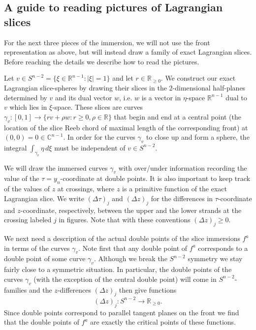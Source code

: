 \documentclass[reqno,11pt]{amsart}
\numberwithin{equation}{section}
\theoremstyle{my}
\theoremstyle{my}
\theoremstyle{your}
\newcommand{\R}{\mathbb{R}}
\newcommand{\C}{\mathbb{C}}
\begin{document}
\subsection{A guide to reading pictures of Lagrangian slices}
For the next three pieces of the immersion, we will not use the front representation as above, but will instead draw a family of exact Lagrangian slices. Before reaching the details we describe how to read the pictures.





Let $v\in S^{n-2}=\{\xi\in \R^{n-1}\colon |\xi|=1\}$ and let $r\in \R_{\ge 0}$. We construct our exact Lagrangian slice-spheres by drawing their slices in the $2$-dimensional half-planes determined by $v$ and its dual vector $w$, i.e. $w$ is a vector in $\eta$-space $\R^{n-1}$ dual to $v$ which lies in $\xi$-space. These slices are curves $\gamma_{v}\colon [0,1]\to\{rv+\rho w\colon r\ge 0, \rho\in\R\}$ that begin and end at a central point (the location of the slice Reeb chord of maximal length of the corresponding front) at $(0,0)=0\in\C^{n-1}$. In order for the curves $\gamma_{v}$ to close up and form a sphere, the integral $\int_{\gamma_{v}}\eta\, d\xi$ must be independent of $v\in S^{n-2}$. 

We will draw the immersed curves $\gamma_{v}$ with over/under information recording the value of the $\tau=y_n$-coordinate  at double points. It is also important to keep track of the values of $z$ at crossings, where $z$ is a primitive function of the exact Lagrangian slice. We write $(\Delta\tau)_j$ and $(\Delta z)_j$ for the differences in $\tau$-coordinate and $z$-coordinate, respectively, between the upper and the lower strands at the crossing labeled $j$ in figures. Note that with these conventions $(\Delta z)_j\ge 0$.

We next need a description of the actual double points of the slice immersions $f^{a}$ in terms of the curves $\gamma_{v}$. Note first that any double point of $f^{a}$ corresponds to a double point of some curve $\gamma_{v}$. Although we break the $S^{n-2}$ symmetry we stay fairly close to a symmetric situation. In particular, the double points of the curves $\gamma_{v}$ (with the exception of the central double point) will come in $S^{n-2}$-families and the $z$-differences $(\Delta z)_j$ then give functions
\[
(\Delta z)_j\colon S^{n-2}\to\R_{\geq 0}.
\] 
Since double points correspond to parallel tangent planes on the front we find that the double points of $f^{a}$ are exactly the critical points of these functions.
\end{document}
